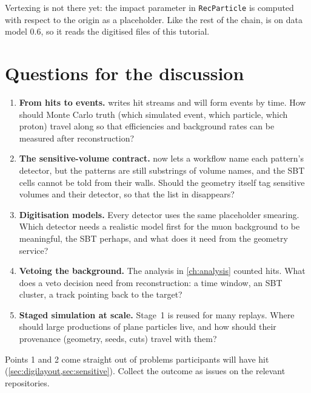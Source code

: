 Vertexing is not there yet: the impact parameter in \texttt{RecParticle} is
computed with respect to the origin as a placeholder. Like the rest of the
chain,  is on data model 0.6, so it reads the digitised files of
this tutorial.

\section{Questions for the discussion}

\begin{enumerate}
  \item \textbf{From hits to events.}  writes hit streams and
         will form events by time. How should Monte Carlo truth
        (which simulated event, which particle, which proton) travel along so
        that efficiencies and background rates can be measured after
        reconstruction?
  \item \textbf{The sensitive-volume contract.}  now lets a
        workflow name each pattern's detector, but the patterns are still
        substrings of volume names, and the SBT cells cannot be told from
        their walls. Should the geometry itself tag sensitive volumes and
        their detector, so that the list in 
        disappears?
  \item \textbf{Digitisation models.} Every detector uses the same placeholder
        smearing. Which detector needs a realistic model first for the muon
        background to be meaningful, the SBT perhaps, and what does it need
        from the geometry service?
  \item \textbf{Vetoing the background.} The analysis in \cref{ch:analysis}
        counted hits. What does a veto decision need from reconstruction: a
        time window, an SBT cluster, a track pointing back to the target?
  \item \textbf{Staged simulation at scale.} Stage~1 is reused for many
        replays. Where should large productions of plane particles live, and
        how should their provenance (geometry, seeds, cuts) travel with them?
\end{enumerate}

\begin{organisernote}
Points 1 and 2 come straight out of problems participants will have hit
(\cref{sec:digilayout,sec:sensitive}). Collect the outcome as issues on the
relevant repositories.
\end{organisernote}
